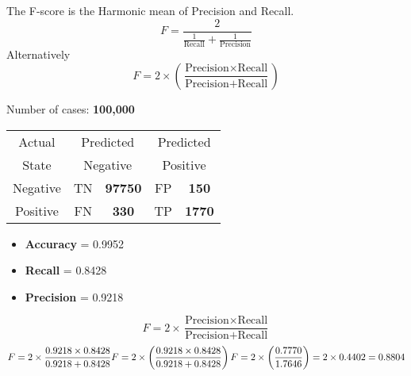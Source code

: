 \documentclass[a4paper,12pt]{article}
\begin{document}
 The F-score is the Harmonic mean of Precision and Recall.
	\[ F = \frac{2}{\frac{1}{\mbox{Recall}} + \frac{1}{\mbox{Precision}}} \]
	Alternatively
	\[ F = 2 \times \left( \frac{\mbox{Precision} \times \mbox{Recall}}{\mbox{Precision} + \mbox{Recall}} \right) \] 
	
	
	
	

	Number of cases: \textbf{100,000}\\ 
	\begin{center}
		\begin{table}[!htbp]
			\begin{tabular}{c  *4c}
\hline
				Actual &  \multicolumn{2}{c}{Predicted} & \multicolumn{2}{c}{Predicted}\\
				State &  \multicolumn{2}{c}{Negative} & \multicolumn{2}{c}{Positive}\\
				\hline
				Negative   & \phantom{spa} TN & \textbf{97750}\phantom{spa}   & FP  & \textbf{150}\\
				Positive   & \phantom{spa} FN & \textbf{330} \phantom{spa}   & TP  & \textbf{1770}\\
				
				\hline
			\end{tabular}
		\end{table}
	\end{center}
	\begin{itemize}
		\item \textbf{Accuracy} = 0.9952
		\item \textbf{Recall} = 0.8428
		\item \textbf{Precision} = 0.9218
	\end{itemize}
	

	\[ F = 2 \times \frac{\mbox{Precision} \times \mbox{Recall}}{\mbox{Precision} + \mbox{Recall}}\]\bigskip
	\[ F = 2 \times \frac{\mbox{0.9218} \times \mbox{0.8428}}{\mbox{0.9218} + \mbox{0.8428}} \\  F = 2 \times \left( \frac{\mbox{0.9218} \times \mbox{0.8428}}{\mbox{0.9218} + \mbox{0.8428}} \right) \\ F = 2 \times \left( \frac{0.7770}{1.7646} \right) = 2 \times 0.4402 = 0.8804 \]
\end{document}
